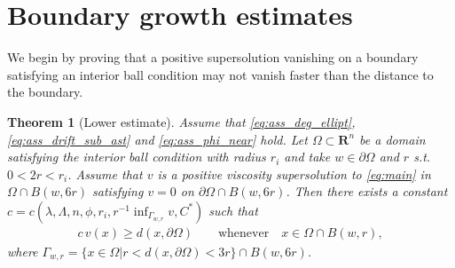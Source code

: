 \documentclass[12pt]{article}
\newtheorem{theorem}{Theorem}
\numberwithin{komcounter}{section}
\begin{document}

\setcounter{theorem}{0}
\setcounter{equation}{0}

\section{Boundary growth estimates}
\label{sec:boundary}

We begin by proving that a positive supersolution vanishing on a boundary satisfying an interior ball condition may not vanish faster than the distance to the boundary.

\begin{theorem}[Lower estimate]\label{le:lower}
Assume that \eqref{eq:ass_deg_ellipt}, \eqref{eq:ass_drift_sub_ast} and \eqref{eq:ass_phi_near} hold.
Let $\Omega \subset \mathbf{R}^n$ be a domain satisfying the interior ball
condition with radius $r_i$ and take $w \in \partial \Omega$ and $r$ s.t. $0<2r < r_i$.
Assume that $v$ is a positive viscosity supersolution to \eqref{eq:main} in
$\Omega \cap B(w, 6r)$ satisfying $v = 0$ on $\partial \Omega \cap B(w,6r)$.
Then there exists a constant $c = c(\lambda, \Lambda, n, \phi, r_i, r^{-1}{\inf_{\Gamma_{w,r}} v}, C^\ast)$ such that
%
\begin{align*}
c\, v(x) \geq  d(x, \partial\Omega) \qquad \text{whenever} \quad x \in \Omega \cap B(w, r),
\end{align*}
%
where $\Gamma_{w,r} = \{x \in \Omega | r < d(x,\partial \Omega) < 3r \} \cap B(w,6r)$.
\end{theorem}

\end{document}
